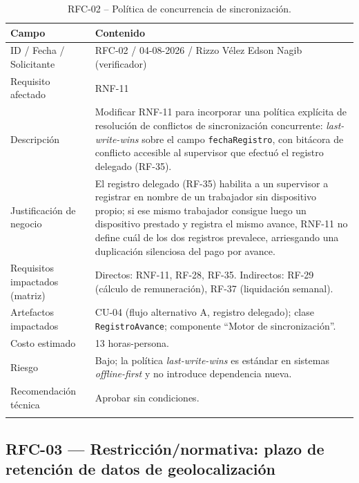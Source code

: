 \documentclass[11pt,a4paper]{article}
\begin{document}
\begin{longtable}{p{3cm}p{10.8cm}}
\toprule
\textbf{Campo} & \textbf{Contenido} \\
\midrule
\endhead
ID / Fecha / Solicitante & RFC-02 / 04-08-2026 / Rizzo Vélez Edson Nagib (verificador) \\
Requisito afectado & RNF-11 \\
Descripción & Modificar RNF-11 para incorporar una política explícita de resolución de conflictos de sincronización concurrente: \emph{last-write-wins} sobre el campo \texttt{fechaRegistro}, con bitácora de conflicto accesible al supervisor que efectuó el registro delegado (RF-35). \\
Justificación de negocio & El registro delegado (RF-35) habilita a un supervisor a registrar en nombre de un trabajador sin dispositivo propio; si ese mismo trabajador consigue luego un dispositivo prestado y registra el mismo avance, RNF-11 no define cuál de los dos registros prevalece, arriesgando una duplicación silenciosa del pago por avance. \\
Requisitos impactados (matriz) & Directos: RNF-11, RF-28, RF-35. Indirectos: RF-29 (cálculo de remuneración), RF-37 (liquidación semanal). \\
Artefactos impactados & CU-04 (flujo alternativo A, registro delegado); clase \texttt{RegistroAvance}; componente ``Motor de sincronización''. \\
Costo estimado & 13 horas-persona. \\
Riesgo & Bajo; la política \emph{last-write-wins} es estándar en sistemas \emph{offline-first} y no introduce dependencia nueva. \\
Recomendación técnica & Aprobar sin condiciones. \\
\bottomrule
\caption{RFC-02 -- Política de concurrencia de sincronización.}
\end{longtable}

\subsection{RFC-03 --- Restricción/normativa: plazo de retención de datos de geolocalización}
\end{document}
